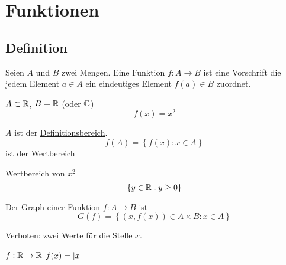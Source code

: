 \section{Funktionen}
\subsection{Definition}
\begin{Def}
  Seien $A$ und $B$ zwei Mengen. Eine Funktion $f:A\to B$ ist eine Vorschrift die jedem Element $a\in A$ ein eindeutiges Element $f(a)\in B$ zuordnet.
\end{Def}
\begin{Bsp}
  $A\subset \mathbb{R}$, $B=\mathbb{R}$ (oder $\mathbb{C}$)
  \[f(x)=x^2\]
\end{Bsp}
\begin{Def}
  $A$ ist der \underline{Definitionsbereich}.
  \[f(A)=\left\{ f(x): x\in A \right\}\]
  ist der Wertbereich
\end{Def}
\begin{Bem}
  Wertbereich von $x^2$
  \[\left\{ y\in\mathbb{R}: y\geq 0 \right\}\]
\end{Bem}
\begin{Def}
  Der Graph einer Funktion $f:A\to B$ ist
  \[G(f)=\left\{ (x, f(x))\in A \times B:x\in A \right\}\]
\end{Def}
\begin{Bsp}
  Verboten: zwei Werte für die Stelle $x$.
\end{Bsp}
\begin{Bsp}
  $f:\mathbb{R}\to\mathbb{R}$ $f(x)=\mathopen| x \mathclose|$
\end{Bsp}
